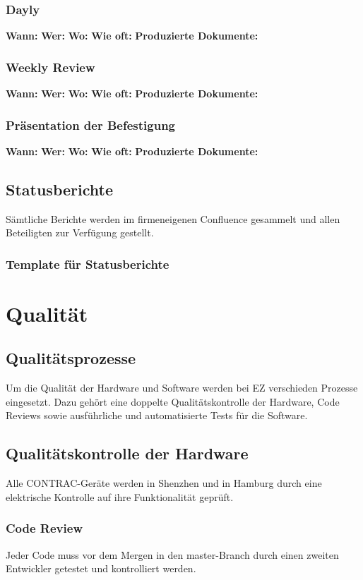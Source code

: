 \subsubsection{Dayly}
\textbf{Wann:} 
\textbf{Wer:}
\textbf{Wo:}
\textbf{Wie oft:}
\textbf{Produzierte Dokumente:}

\subsubsection{Weekly Review}
\textbf{Wann:} 
\textbf{Wer:}
\textbf{Wo:}
\textbf{Wie oft:}
\textbf{Produzierte Dokumente:}

\subsubsection{Präsentation der Befestigung}
\textbf{Wann:} 
\textbf{Wer:}
\textbf{Wo:}
\textbf{Wie oft:}
\textbf{Produzierte Dokumente:}

\subsection{Statusberichte}
Sämtliche Berichte werden im firmeneigenen Confluence gesammelt und allen Beteiligten zur Verfügung gestellt.

\subsubsection{Template für Statusberichte}




\section{Qualität}
\subsection{Qualitätsprozesse}
Um die Qualität der Hardware und Software werden bei EZ verschieden Prozesse eingesetzt. Dazu gehört eine doppelte Qualitätskontrolle der Hardware, Code Reviews sowie ausführliche und automatisierte Tests für die Software.
\subsection{Qualitätskontrolle der Hardware}
Alle CONTRAC-Geräte werden in Shenzhen und in Hamburg durch eine elektrische Kontrolle auf ihre Funktionalität geprüft.
\subsubsection{Code Review}
Jeder Code muss vor dem Mergen in den master-Branch durch einen zweiten Entwickler getestet und kontrolliert werden.
